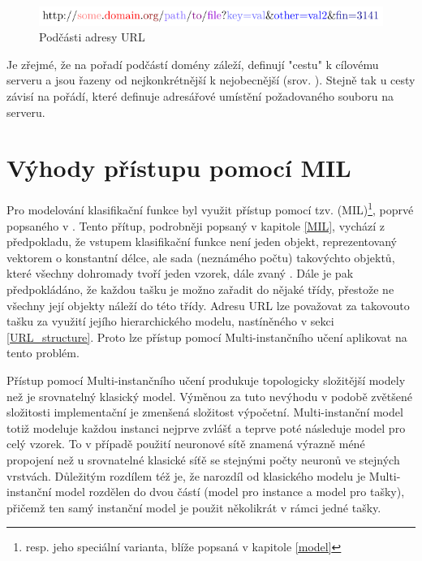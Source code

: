 \begin{figure}[h]
	\centering
	\includegraphics{images/url_subparts/url_subparts.pdf}
	\caption{Podčásti adresy URL}\label{url_subparts}
\end{figure}

Je zřejmé, že na pořadí podčástí domény záleží, definují "cestu" k cílovému serveru a jsou řazeny od nejkonkrétnější k nejobecnější (srov. \cite{mockapetris_domain_1987}).	Stejně tak u cesty závisí na pořádí, které definuje adresářové umístění požadovaného souboru na serveru.

\section{Výhody přístupu pomocí MIL}

Pro modelování klasifikační funkce byl využit přístup pomocí tzv.  (MIL)\footnote{resp. jeho speciální varianta, blíže popsaná v kapitole \ref{model}}, poprvé popsaného v \cite{dietterich_solving_1997}. Tento přítup, podrobněji popsaný v kapitole \ref{MIL}, vychází z předpokladu, že vstupem klasifikační funkce není jeden objekt, reprezentovaný vektorem o konstantní délce, ale sada (neznámého počtu) takovýchto objektů, které všechny dohromady tvoří jeden vzorek, dále zvaný . Dále je pak předpokládáno, že každou tašku je možno zařadit do nějaké třídy, přestože ne všechny její objekty náleží do této třídy.  Adresu URL lze považovat za takovouto tašku za využití jejího hierarchického modelu, nastíněného v sekci \ref{URL_structure}. Proto lze přístup pomocí Multi-instančního učení aplikovat na tento problém.

Přístup pomocí Multi-instančního učení produkuje topologicky složitější modely než je srovnatelný klasický model. Výměnou za tuto nevýhodu v podobě zvětšené složitosti implementační je zmenšená složitost výpočetní. Multi-instanční model totiž modeluje každou instanci nejprve zvlášť a teprve poté následuje model pro celý vzorek. To v případě použití neuronové sítě znamená výrazně méné propojení než u srovnatelné klasické síťě se stejnými počty neuronů ve stejných vrstvách. Důležitým rozdílem též je, že narozdíl od klasického modelu je Multi-instanční model rozdělen do dvou částí (model pro instance a model pro tašky), přičemž ten samý instanční model je použit několikrát v rámci jedné tašky.

